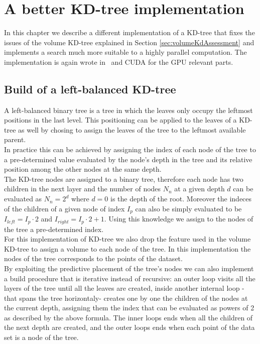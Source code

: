 \chapter{A better KD-tree implementation}\label{ch:fkdtree}
In this chapter we describe a different implementation of a KD-tree that fixes the issues of the volume KD-tree explained in Section \ref{sec:volumeKdAssessment} and implements a search much more suitable to a highly parallel computation. The implementation is again wrote in \CC\ and CUDA for the GPU relevant parts.

\section{Build of a left-balanced KD-tree}
A left-balanced binary tree is a tree in which the leaves only occupy the leftmost positions in the last level. This positioning can be applied to the leaves of a KD-tree as well by chosing to assign the leaves of the tree to the leftmost available parent.\\
In practice this can be achieved by assigning the index of each node of the tree to a pre-determined value evaluated by the node's depth in the tree and its relative position among the other nodes at the same depth.\\
The KD-tree nodes are assigned to a binary tree, therefore each node has two children in the next layer and the number of nodes $N_n$ at a given depth $d$ can be evaluated as $N_n = 2^d$ where $d = 0$ is the depth of the root. Moreover the indeces of the children of a given node of index $I_p$ can also be simply evaluated to be $I_{left} = I_p \cdot 2$ and $I_{right} = I_p \cdot 2 + 1$. Using this knowledge we assign to the nodes of the tree a pre-determined index.\\
For this implementation of KD-tree we also drop the feature used in the volume KD-tree to assign a volume to each node of the tree. In this implementation the nodes of the tree corresponds to the points of the dataset.\\
By exploiting the predictive placement of the tree's nodes we can also implement a build procedure that is iterative instead of recursive: an outer loop visits all the layers of the tree until all the leaves are created, inside another internal loop -that spans the tree horizontaly- creates one by one the children of the nodes at the current depth, assigning them the index that can be evaluated as powers of 2 as described by the above formula. The inner loops ends when all the children of the next depth are created, and the outer loops ends when each point of the data set is a node of the tree.\\
